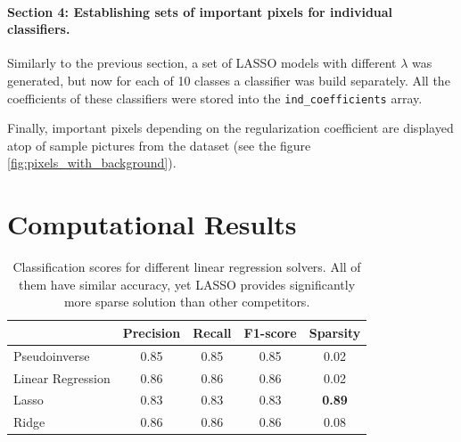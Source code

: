 \documentclass{article}
\begin{document}
\paragraph{Section 4: Establishing sets of important pixels for individual classifiers.} Similarly to the previous section, a set of LASSO models with different $\lambda$ was generated, but now for each of 10 classes a classifier was build separately. All the coefficients of these classifiers were stored into the \texttt{ind\_coefficients} array. 

Finally, important pixels depending on the regularization coefficient are displayed atop of sample pictures from the dataset (see the figure \ref{fig:pixels_with_background}). 
    

\section{Computational Results}

\begin{table}
    \centering
    \label{table:classification_quality}
    \begin{tabular}{l||c|c|c|c||}
         & Precision & Recall & F1-score & Sparsity \\
         \hline \hline 
         Pseudoinverse & 0.85 & 0.85 & 0.85 &  0.02 \\
         \hline
         Linear Regression & 0.86 & 0.86 & 0.86 & 0.02 \\
         \hline
         Lasso & 0.83 & 0.83 & 0.83 & \textbf{0.89} \\
         \hline
         Ridge & 0.86 & 0.86 & 0.86 & 0.08 \\
         \hline 
    \end{tabular}
    \caption{Classification scores for different linear regression solvers. All of them have similar accuracy, yet LASSO provides significantly more sparse solution than other competitors.}
\end{table}
\end{document}
